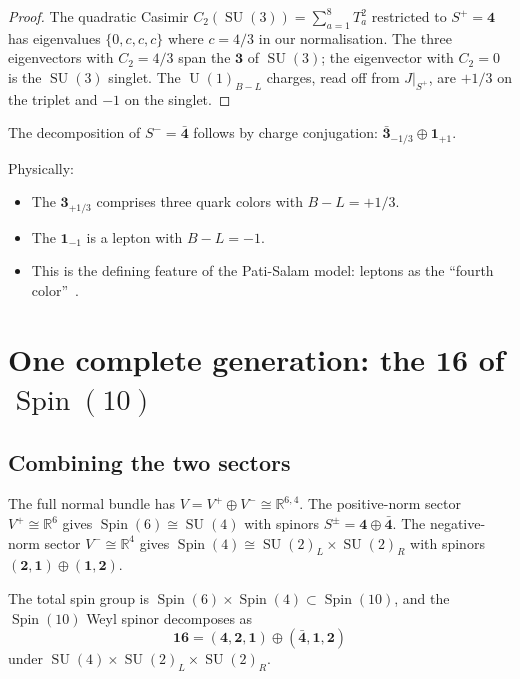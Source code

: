 \documentclass[12pt,a4paper]{article}
\theoremstyle{definition}
\newcommand{\SU}{\operatorname{SU}}
\newcommand{\U}{\operatorname{U}}
\newcommand{\Spin}{\operatorname{Spin}}
\newcommand{\R}{\mathbb{R}}
\begin{document}
\begin{proof}
The quadratic Casimir $C_2(\SU(3)) = \sum_{a=1}^{8} T_a^2$ restricted to $S^+ = \mathbf{4}$ has eigenvalues $\{0, c, c, c\}$ where $c = 4/3$ in our normalisation.
The three eigenvectors with $C_2 = 4/3$ span the $\mathbf{3}$ of $\SU(3)$; the eigenvector with $C_2 = 0$ is the $\SU(3)$ singlet.
The $\U(1)_{B-L}$ charges, read off from $J|_{S^+}$, are $+1/3$ on the triplet and $-1$ on the singlet.
\end{proof}

The decomposition of $S^- = \bar{\mathbf{4}}$ follows by charge conjugation: $\bar{\mathbf{3}}_{-1/3} \oplus \mathbf{1}_{+1}$.

Physically:
\begin{itemize}[nosep]
\item The $\mathbf{3}_{+1/3}$ comprises three quark colors with $B-L = +1/3$.
\item The $\mathbf{1}_{-1}$ is a lepton with $B-L = -1$.
\item This is the defining feature of the Pati-Salam model: leptons as the ``fourth color''~\cite{PatiSalam1974}.
\end{itemize}


\section{One complete generation: the \texorpdfstring{$\mathbf{16}$}{16} of \texorpdfstring{$\Spin(10)$}{Spin(10)}}
\label{sec:generation}

\subsection{Combining the two sectors}

The full normal bundle has $V = V^+ \oplus V^- \cong \R^{6,4}$.
The positive-norm sector $V^+ \cong \R^6$ gives $\Spin(6) \cong \SU(4)$ with spinors $S^\pm = \mathbf{4} \oplus \bar{\mathbf{4}}$.
The negative-norm sector $V^- \cong \R^4$ gives $\Spin(4) \cong \SU(2)_L \times \SU(2)_R$ with spinors $(\mathbf{2}, \mathbf{1}) \oplus (\mathbf{1}, \mathbf{2})$.

The total spin group is $\Spin(6) \times \Spin(4) \subset \Spin(10)$, and the $\Spin(10)$ Weyl spinor decomposes as
\begin{equation}
\label{eq:16_decomp}
\mathbf{16} = (\mathbf{4}, \mathbf{2}, \mathbf{1}) \oplus (\bar{\mathbf{4}}, \mathbf{1}, \mathbf{2})
\end{equation}
under $\SU(4) \times \SU(2)_L \times \SU(2)_R$.
\end{document}
